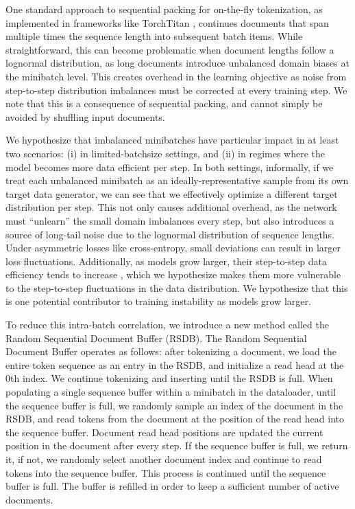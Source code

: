 \documentclass{article}
\begin{document}
One standard approach to sequential packing for on-the-fly tokenization, as implemented in frameworks like TorchTitan \citep{liang2025torchtitan}, continues documents that span multiple times the sequence length into subsequent batch items. While straightforward, this can become problematic when document lengths follow a lognormal distribution, as long documents introduce unbalanced domain biases at the minibatch level. This creates overhead in the learning objective as noise from step-to-step distribution imbalances must be corrected at every training step. We note that this is a consequence of sequential packing, and cannot simply be avoided by shuffling input documents.

We hypothesize that imbalanced minibatches have particular impact in at least two scenarios: (i) in limited-batchsize settings, and (ii) in regimes where the model becomes more data efficient per step. In both settings, informally, if we treat each unbalanced minibatch as an ideally-representative sample from its own target data generator, we can see that we effectively optimize a different target distribution per step. This not only causes additional overhead, as the network must ``unlearn'' the small domain imbalances every step, but also introduces a source of long-tail noise due to the lognormal distribution of sequence lengths. Under asymmetric losses like cross-entropy, small deviations can result in larger loss fluctuations. Additionally, as models grow larger, their step-to-step data efficiency tends to increase \citep{kaplan2020scalinglawsneurallanguage}, which we hypothesize makes them more vulnerable to the step-to-step fluctuations in the data distribution. We hypothesize that this is one potential contributor to training instability as models grow larger.

To reduce this intra-batch correlation, we introduce a new method called the Random Sequential Document Buffer (RSDB). The Random Sequential Document Buffer operates as follows: after tokenizing a document, we load the entire token sequence as an entry in the RSDB, and initialize a read head at the $0$th index. We continue tokenizing and inserting until the RSDB is full. When populating a single sequence buffer within a minibatch in the dataloader, until the sequence buffer is full, we randomly sample an index of the document in the RSDB, and read tokens from the document at the position of the read head into the sequence buffer. Document read head positions are updated the current position in the document after every step. If the sequence buffer is full, we return it, if not, we randomly select another document index and continue to read tokens into the sequence buffer. This process is continued until the sequence buffer is full. The buffer is refilled in order to keep a sufficient number of active documents.
\end{document}
